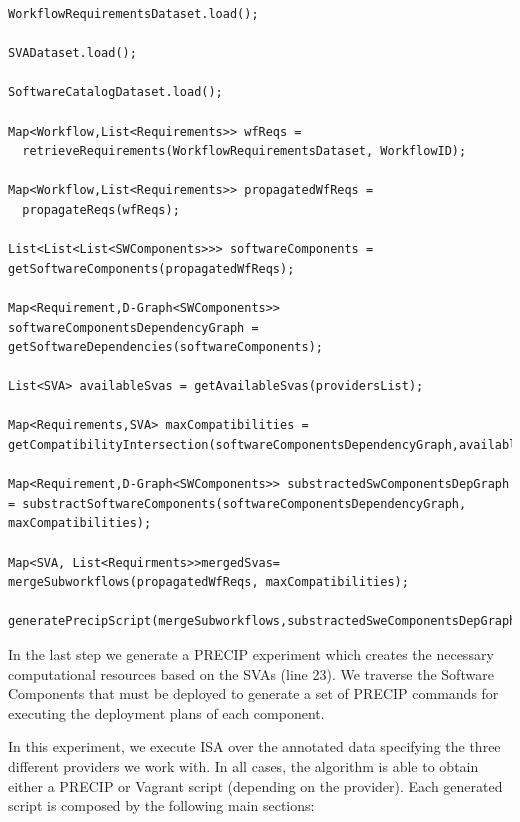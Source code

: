 \begin{lstlisting}[caption={Pseudo-code overview of the ISA},label={lst:pseudo}]
WorkflowRequirementsDataset.load();

SVADataset.load();

SoftwareCatalogDataset.load();

Map<Workflow,List<Requirements>> wfReqs = 
  retrieveRequirements(WorkflowRequirementsDataset, WorkflowID);

Map<Workflow,List<Requirements>> propagatedWfReqs = 
  propagateReqs(wfReqs);

List<List<List<SWComponents>>> softwareComponents = getSoftwareComponents(propagatedWfReqs);

Map<Requirement,D-Graph<SWComponents>> softwareComponentsDependencyGraph = getSoftwareDependencies(softwareComponents);

List<SVA> availableSvas = getAvailableSvas(providersList);

Map<Requirements,SVA> maxCompatibilities = getCompatibilityIntersection(softwareComponentsDependencyGraph,availableSvas);

Map<Requirement,D-Graph<SWComponents>> substractedSwComponentsDepGraph = substractSoftwareComponents(softwareComponentsDependencyGraph, maxCompatibilities);

Map<SVA, List<Requirments>>mergedSvas= mergeSubworkflows(propagatedWfReqs, maxCompatibilities);

generatePrecipScript(mergeSubworkflows,substractedSweComponentsDepGraph);

\end{lstlisting}

In the last step we generate a PRECIP experiment which creates the necessary computational resources based on the SVAs (line 23). We traverse the Software Components that must be deployed to generate a set of PRECIP commands for executing the deployment plans of each component.


In this experiment, we execute ISA over the annotated data specifying the three different providers we work with. In all cases, the algorithm is able to obtain either a PRECIP or Vagrant script (depending on the provider). Each generated script is composed by the following main sections:

